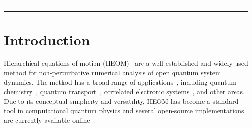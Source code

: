 \documentclass{SciPost}
\begin{document}
\noindent\textcolor{white!90!black}{%
}



\vspace{10pt}
\noindent\rule{\textwidth}{1pt}
\tableofcontents
\noindent\rule{\textwidth}{1pt}
\vspace{10pt}

\section{Introduction}

Hierarchical equations of motion (HEOM)~\cite{Tanimura1989, Tanimura2020} are a well-established and widely used method for non-perturbative numerical analysis of open quantum system dynamics. The method has a broad range of applications~\cite{Tanimura2020}, including quantum chemistry~\cite{Bai2024}, quantum transport~\cite{Yang2025}, correlated electronic systems~\cite{Ye2016, Dan2023}, and other areas. Due to its conceptual simplicity and versatility, HEOM has become a standard tool in computational quantum physics and several open-source implementations are currently available online~\cite{Struempfer2012, Lambert2023, Huang2023, Zhang2024}.
\end{document}

